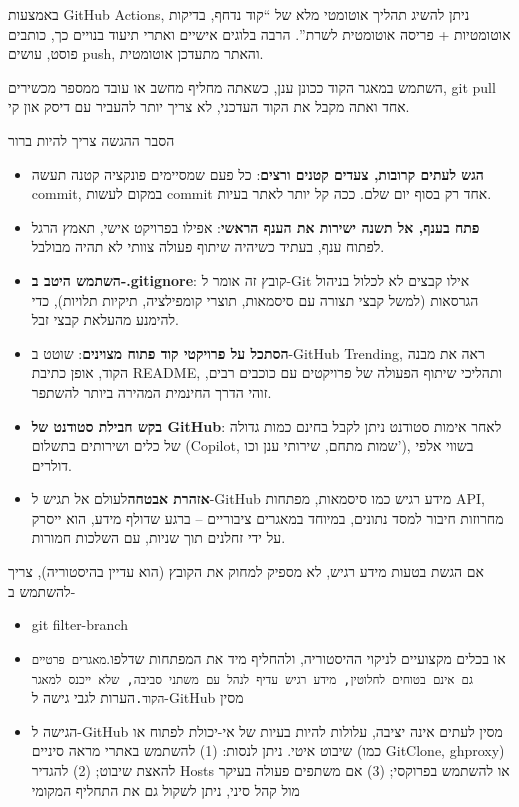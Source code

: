 
באמצעות GitHub Actions, ניתן להשיג תהליך אוטומטי מלא של “קוד נדחף, בדיקות אוטומטיות + פריסה אוטומטית לשרת”. הרבה בלוגים אישיים ואתרי תיעוד בנויים כך, כותבים פוסט, עושים push, והאתר מתעדכן אוטומטית.


השתמש במאגר הקוד ככונן ענן, כשאתה מחליף מחשב או עובד ממספר מכשירים, git pull אחד ואתה מקבל את הקוד העדכני, לא צריך יותר להעביר עם דיסק און קי.


הסבר ההגשה צריך להיות ברור


\begin{itemize}
  \item \textbf{הגש לעתים קרובות, צעדים קטנים ורצים}: כל פעם שמסיימים פונקציה קטנה תעשה commit, במקום לעשות commit אחד רק בסוף יום שלם. ככה קל יותר לאתר בעיות.
  \item \textbf{פתח בענף, אל תשנה ישירות את הענף הראשי}: אפילו בפרויקט אישי, תאמץ הרגל לפתוח ענף, בעתיד כשיהיה שיתוף פעולה צוותי לא תהיה מבולבל.
  \item \textbf{השתמש היטב ב-.gitignore}: קובץ זה אומר ל-Git אילו קבצים לא לכלול בניהול הגרסאות (למשל קבצי תצורה עם סיסמאות, תוצרי קומפילציה, תיקיות תלויות), כדי להימנע מהעלאת קבצי זבל.
  \item \textbf{הסתכל על פרויקטי קוד פתוח מצוינים}: שוטט ב-GitHub Trending, ראה את מבנה הקוד, אופן כתיבת README, ותהליכי שיתוף הפעולה של פרויקטים עם כוכבים רבים, זוהי הדרך החינמית המהירה ביותר להשתפר.
  \item \textbf{בקש חבילת סטודנט של GitHub}: לאחר אימות סטודנט ניתן לקבל בחינם כמות גדולה של כלים ושירותים בתשלום (Copilot, שמות מתחם, שירותי ענן וכו'), בשווי אלפי דולרים.
  \item \textbf{אזהרת אבטחה}לעולם אל תגיש ל-GitHub מידע רגיש כמו סיסמאות, מפתחות API, מחרוזות חיבור למסד נתונים, במיוחד במאגרים ציבוריים – ברגע שדולף מידע, הוא ייסרק על ידי זחלנים תוך שניות, עם השלכות חמורות.
\end{itemize}

\begin{tcbwarn}{אם הגשת בטעות מידע רגיש, לא מספיק למחוק את הקובץ (הוא עדיין בהיסטוריה), צריך להשתמש ב-}
\begin{itemize}
  \item git filter-branch
  \item או בכלים מקצועיים לניקוי ההיסטוריה, ולהחליף מיד את המפתחות שדלפו.\texttt{מאגרים פרטיים גם אינם בטוחים לחלוטין, מידע רגיש עדיף לנהל עם משתני סביבה, שלא ייכנס למאגר הקוד.\allowbreak }הערות לגבי גישה ל-GitHub מסין
  \item הגישה ל-GitHub מסין לעתים אינה יציבה, עלולות להיות בעיות של אי-יכולת לפתוח או שיבוט איטי. ניתן לנסות: (1) להשתמש באתרי מראה סיניים (כמו GitClone, ghproxy) להאצת שיבוט; (2) להגדיר Hosts או להשתמש בפרוקסי; (3) אם משתפים פעולה בעיקר מול קהל סיני, ניתן לשקול גם את התחליף המקומי
\end{itemize}

\end{tcbwarn}

